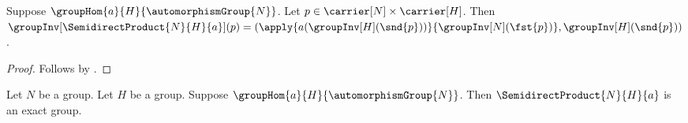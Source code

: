 \begin{proposition}\label{semidirect_product_inv_apply}
    Suppose $\groupHom{a}{H}{\automorphismGroup{N}}$.
    Let $p\in\carrier[N]\times\carrier[H]$.
    Then
        $\groupInv[\SemidirectProduct{N}{H}{a}](p)=
            (\apply{a(\groupInv[H](\snd{p}))}
                {\groupInv[N](\fst{p})},
             \groupInv[H](\snd{p}))$.
\end{proposition}
\begin{proof}
    Follows by
        .
\end{proof}

\begin{theorem}\label{semidirect_product_is_exact_group}
    Let $N$ be a group.
    Let $H$ be a group.
    Suppose $\groupHom{a}{H}{\automorphismGroup{N}}$.
    Then $\SemidirectProduct{N}{H}{a}$ is an exact group.
\end{theorem}
